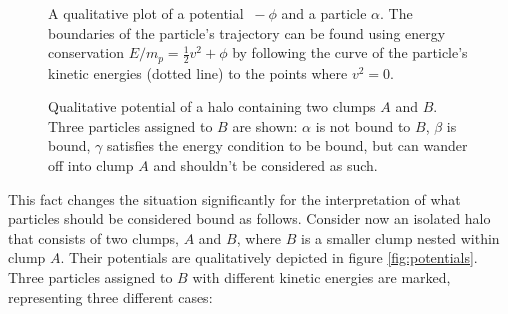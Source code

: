 \begin{figure}[h!]
	\centering
	\caption{A qualitative plot of a potential $\ -\phi$ and a particle $\alpha$. 
		The boundaries of the particle's trajectory can be found using energy conservation $E/m_p = \frac{1}{2}v^2 + \phi$ by following the curve of the particle's kinetic energies (dotted line) to the points where $v^2=0$.	
	}%
	\label{fig:orbits}
	\endminipage%
	\hspace*{\fill}
	\caption{Qualitative potential of a halo containing two clumps $A$ and $B$. Three particles assigned to $B$ are shown: $\alpha$ is not bound to $B$, $\beta$ is bound, $\gamma$ satisfies the energy condition to be bound, but can wander off into clump $A$ and shouldn't be considered as such.
	}%
	\label{fig:potentials}
	\endminipage\hspace*{\fill} 
\end{figure}
%
This fact changes the situation significantly for the interpretation of what particles should be considered bound as follows.
Consider now an isolated halo that consists of two clumps, $A$ and $B$, where $B$ is a smaller clump nested within clump $A$.
Their potentials are qualitatively depicted in figure \eqref{fig:potentials}. 
Three particles assigned to $B$ with different kinetic energies are marked, representing three different cases:
%
